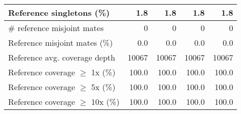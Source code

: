 \documentclass[12pt,a4paper]{article}
\begin{document}
\begin{table}[ht]
\begin{center}
\begin{tabular}{|l*{4}{|r}|}
Reference singletons (\%) & 1.8 & 1.8 & 1.8 & 1.8 \\ \hline
\# reference misjoint mates & 0 & 0 & 0 & 0 \\ \hline
Reference misjoint mates (\%) & 0.0 & 0.0 & 0.0 & 0.0 \\ \hline
Reference avg. coverage depth & 10067 & 10067 & 10067 & 10067 \\ \hline
Reference coverage $\geq$ 1x (\%) & 100.0 & 100.0 & 100.0 & 100.0 \\ \hline
Reference coverage $\geq$ 5x (\%) & 100.0 & 100.0 & 100.0 & 100.0 \\ \hline
Reference coverage $\geq$ 10x (\%) & 100.0 & 100.0 & 100.0 & 100.0 \\ \hline
\end{tabular}
\end{center}
\end{table}
\end{document}
